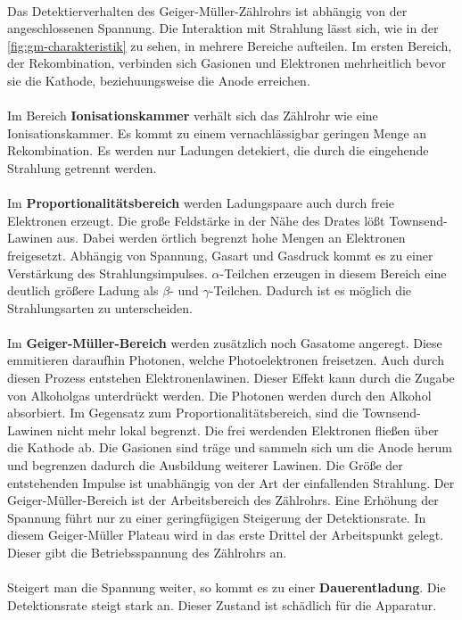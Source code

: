 \\
Das Detektierverhalten des Geiger-Müller-Zählrohrs ist abhängig von der angeschlossenen Spannung.
Die Interaktion mit Strahlung lässt sich, wie in der \autoref{fig:gm-charakteristik} zu sehen, in mehrere Bereiche aufteilen.
Im ersten Bereich, der Rekombination, verbinden sich Gasionen und Elektronen 
mehrheitlich bevor sie die Kathode, beziehuungsweise die Anode erreichen. 
\\
\\
Im Bereich \textbf{Ionisationskammer} verhält sich das Zählrohr wie eine Ionisationskammer.
Es kommt zu einem vernachlässigbar geringen Menge an Rekombination.
Es werden nur Ladungen detekiert, die durch die eingehende Strahlung getrennt werden.
\\
\\
Im \textbf{Proportionalitätsbereich} werden Ladungspaare auch durch freie Elektronen erzeugt.
Die große Feldstärke in der Nähe des Drates lößt Townsend-Lawinen aus. Dabei werden örtlich begrenzt hohe Mengen an Elektronen freigesetzt.
Abhängig von Spannung, Gasart und Gasdruck kommt es zu einer Verstärkung des Strahlungsimpulses.%
$α$-Teilchen erzeugen in diesem Bereich eine deutlich größere Ladung als $β$- und $γ$-Teilchen.
Dadurch ist es möglich die Strahlungsarten zu unterscheiden.
\\
\\
Im \textbf{Geiger-Müller-Bereich} werden zusätzlich noch Gasatome angeregt.
Diese emmitieren daraufhin Photonen, welche Photoelektronen freisetzen.
Auch durch diesen Prozess entstehen Elektronenlawinen.
Dieser Effekt kann durch die Zugabe von Alkoholgas unterdrückt werden.
Die Photonen werden durch den Alkohol absorbiert. Im Gegensatz zum Proportionalitätsbereich,
sind die Townsend-Lawinen nicht mehr lokal begrenzt. Die frei werdenden Elektronen fließen über die Kathode ab.
Die Gasionen sind träge und sammeln sich um die Anode herum und begrenzen dadurch die Ausbildung weiterer Lawinen.
Die Größe der entstehenden Impulse ist unabhängig von der Art der einfallenden Strahlung.
Der Geiger-Müller-Bereich ist der Arbeitsbereich des Zählrohrs. 
Eine Erhöhung der Spannung führt nur zu einer geringfügigen Steigerung der Detektionsrate.
In diesem Geiger-Müller Plateau wird in das erste Drittel der Arbeitspunkt gelegt.
Dieser gibt die Betriebsspannung des Zählrohrs an.\\
\\
Steigert man die Spannung weiter, so kommt es zu einer \textbf{Dauerentladung}.
Die Detektionsrate steigt stark an. Dieser Zustand ist schädlich für die Apparatur.
